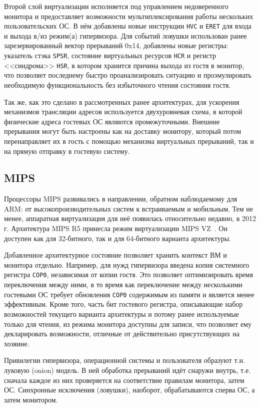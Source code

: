 Второй слой виртуализации исполняется под управлением недоверенного монитора и предоставляет возможности мультиплексирования работы нескольких пользовательских ОС. В нём добавлены новые инструкции \texttt{HVC} и \texttt{ERET} для входа и выхода в/из режим(а) гипервизора. Для событий ловушки использован ранее зарезервированный вектор прерываний 0x14, добавлены новые регистры: указатель стэка \texttt{SPSR}, состояние виртуальных ресурсов \texttt{HCR} и регистр <<синдрома>> \texttt{HSR}, в котором хранится причина выхода из гостя  в монитор, что позволяет последнему быстро проанализировать ситуацию и проэмулировать необходимую функциональность без избыточного чтения состояния гостя.

Так же, как это сделано в рассмотренных ранее архитектурах, для ускорения механизмов трансляции адресов используется двухуровневая схема, в которой физические адреса гостевых ОС являются промежуточными. Внешние прерывания могут быть настроены как на доставку монитору, который потом перенаправляет их в гость с помощью механизма виртуальных прерываний, так и на прямую отправку в гостевую систему.

\subsection{MIPS}

Процессоры MIPS развивались в направлении, обратном наблюдаемому для ARM: от высокопроизводительных систем к встраиваемым и мобильным. Тем не менее, аппаратная виртуализация для неё появилась относительно недавно, в 2012 г. Архитектура MIPS R5 принесла режим виртуализации MIPS VZ~\cite{mips-vz}. Он доступен как для 32-битного, так и для 64-битного варианта архитектуры.

Добавленное архитектурное состояние позволяет хранить контекст ВМ и монитора отдельно. Например, для нужд гипервизора введена копия системного регистра \texttt{COP0}, независимая от копии гостя. Это позволяет оптимизировать время переключения между ними, в то время как переключение между несколькими гостевыми ОС требует обновления \texttt{COP0} содержимым из памяти и является менее эффективным. Кроме того, часть бит гостевого регистра, описывающие набор возможностей текущего варианта архитектуры и потому ранее используемые только для чтения, из режима монитора доступны для записи, что позволяет ему декларировать возможности, отличные от действительно присутствующих на хозяине.

Привилегии гипервизора, операционной системы и пользователя образуют т.н. луковую (\abbr onion) модель. В ней обработка прерываний идёт снаружи внутрь, т.е. сначала каждое из них проверяется на соответствие правилам монитора, затем ОС. Синхронные исключения (ловушки), наоборот, обрабатываются сперва ОС, а затем монитором.

